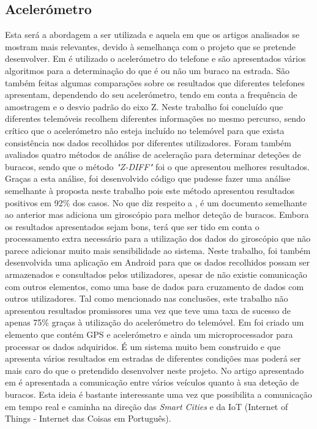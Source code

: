 \subsection{Acelerómetro}
\label{subsec: acelerometro}
Esta será a abordagem a ser utilizada e aquela em que os artigos analisados se mostram mais relevantes, devido à semelhança com o projeto que se pretende desenvolver. Em \cite{Mednis2011} é utilizado o acelerómetro do telefone e são apresentados vários algoritmos para a determinação do que é ou não um buraco na estrada. São também feitas algumas comparações sobre os resultados que diferentes telefones apresentam, dependendo do seu acelerómetro, tendo em conta a frequência de amostragem e o desvio padrão do eixo Z.
Neste trabalho foi concluído que diferentes telemóveis recolhem diferentes informações no mesmo percurso, sendo crítico que o acelerómetro não esteja incluído no telemóvel para que exista consistência nos dados recolhidos por diferentes utilizadores.
Foram também avaliados quatro métodos de análise de aceleração para determinar deteções de buracos, sendo que o método \emph{"Z-DIFF"} foi o que apresentou melhores resultados.
Graças a esta análise, foi desenvolvido código que pudesse fazer uma análise semelhante à proposta neste trabalho pois este método apresentou resultados positivos em 92\% dos casos.
No que diz respeito a \cite{Fouad}, é um documento semelhante ao anterior mas adiciona um giroscópio para melhor deteção de buracos. Embora os resultados apresentados sejam bons, terá que ser tido em conta o processamento extra necessário para a utilização dos dados do giroscópio que não parece adicionar muito mais sensibilidade ao sistema.
Neste trabalho, foi também desenvolvida uma aplicação em Android para que os dados recolhidos possam ser armazenados e consultados pelos utilizadores, apesar de não existie comunicação com outros elementos, como uma base de dados para cruzamento de dados com outros utilizadores.
Tal como mencionado nas conclusões, este trabalho não apresentou resultados promissores uma vez que teve uma taxa de sucesso de apenas 75\% graças à utilização do acelerómetro do telemóvel.
Em \cite{Chen2011} foi criado um elemento que contém GPS e acelerómetro e ainda um microprocessador para processar os dados adquiridos. É um sistema muito bem construido e que apresenta vários resultados em estradas de diferentes condições mas poderá ser mais caro do que o pretendido desenvolver neste projeto. No artigo apresentado em \cite{Jang} é apresentada a comunicação entre vários veículos quanto à sua deteção de buracos. Esta ideia é bastante interessante uma vez que possibilita a comunicação em tempo real e caminha na direção das \emph{Smart Cities} e da IoT (Internet of Things - Internet das Coisas em Português).
